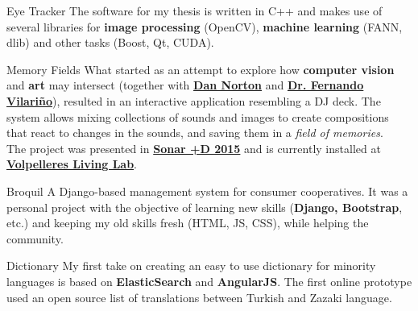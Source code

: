 
\begin{cvopensource}

  \cvproject
    {Eye Tracker} %
    {
        The software for my thesis is written in C++ and makes use of several libraries for \textbf{image processing} (OpenCV), \textbf{machine learning} (FANN, dlib) and other tasks (Boost, Qt, CUDA).
    }
    
  \cvproject
    {Memory Fields} %
    {
		What started as an attempt to explore how \textbf{computer vision} and \textbf{art} may intersect (together with \textbf{\href{http://ablab.org}{Dan Norton}} and \textbf{\href{http://vi.cvc.uab.es/fernando-vilarino}{Dr. Fernando Vilari\~no}}), resulted in an interactive application resembling a DJ deck. The system allows mixing collections of sounds and images to create compositions that react to changes in the sounds, and saving them in a \textit{field of memories}.\\
        The project was presented in \textbf{\href{http://sonarplusd.com/}{Sonar +D 2015}} and is currently installed at \textbf{\href{http://l3.cvc.uab.es/}{Volpelleres Living Lab}}.
    }
    
  \cvproject
    {Broquil} %
    {
       A Django-based management system for consumer cooperatives. It was a personal project with the objective of learning new skills (\textbf{Django, Bootstrap}, etc.) and keeping my old skills fresh (HTML, JS, CSS), while helping the community.
    }
    
  \cvproject
    {Dictionary} %
    {
       My first take on creating an easy to use dictionary for minority languages is based on \textbf{ElasticSearch} and \textbf{AngularJS}. The first online prototype used an open source list of translations between Turkish and Zazaki language.
    }
\end{cvopensource}
